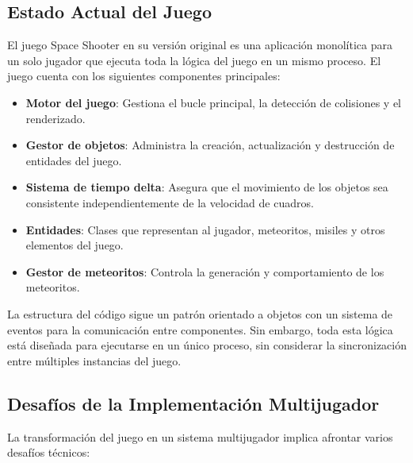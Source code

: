 \documentclass[12pt,letterpaper]{article}
\begin{document}
\subsection{Estado Actual del Juego}

El juego Space Shooter en su versión original es una aplicación monolítica para un solo jugador que ejecuta toda la lógica del juego en un mismo proceso. El juego cuenta con los siguientes componentes principales:

\begin{itemize}
    \item \textbf{Motor del juego}: Gestiona el bucle principal, la detección de colisiones y el renderizado.
    \item \textbf{Gestor de objetos}: Administra la creación, actualización y destrucción de entidades del juego.
    \item \textbf{Sistema de tiempo delta}: Asegura que el movimiento de los objetos sea consistente independientemente de la velocidad de cuadros.
    \item \textbf{Entidades}: Clases que representan al jugador, meteoritos, misiles y otros elementos del juego.
    \item \textbf{Gestor de meteoritos}: Controla la generación y comportamiento de los meteoritos.
\end{itemize}

La estructura del código sigue un patrón orientado a objetos con un sistema de eventos para la comunicación entre componentes. Sin embargo, toda esta lógica está diseñada para ejecutarse en un único proceso, sin considerar la sincronización entre múltiples instancias del juego.

\subsection{Desafíos de la Implementación Multijugador}

La transformación del juego en un sistema multijugador implica afrontar varios desafíos técnicos:
\end{document}
